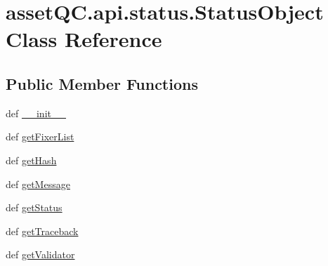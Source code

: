 \hypertarget{classassetQC_1_1api_1_1status_1_1StatusObject}{\section{asset\-Q\-C.\-api.\-status.\-Status\-Object \-Class \-Reference}
\label{d3/d7f/classassetQC_1_1api_1_1status_1_1StatusObject}
}
\subsection*{\-Public \-Member \-Functions}
\begin{DoxyCompactItemize}
\item 
def \hyperlink{classassetQC_1_1api_1_1status_1_1StatusObject_a4cf86eb6ad7484a2fce310e3adceb90a}{\-\_\-\-\_\-init\-\_\-\-\_\-}
\item 
def \hyperlink{classassetQC_1_1api_1_1status_1_1StatusObject_ad8aa307fb35a5ae8f2b706b1da4dd97c}{get\-Fixer\-List}
\item 
def \hyperlink{classassetQC_1_1api_1_1status_1_1StatusObject_aaa5c50ebf8d624e0fc7f16a09e1fea74}{get\-Hash}
\item 
def \hyperlink{classassetQC_1_1api_1_1status_1_1StatusObject_a7bef1acde665d7b5f4ec7e9aa4ce66db}{get\-Message}
\item 
def \hyperlink{classassetQC_1_1api_1_1status_1_1StatusObject_a513e7d4b09a812d72f6965cb0427b6f5}{get\-Status}
\item 
def \hyperlink{classassetQC_1_1api_1_1status_1_1StatusObject_a34ad6bc766907cb91eff1e1017769100}{get\-Traceback}
\item 
def \hyperlink{classassetQC_1_1api_1_1status_1_1StatusObject_af2254cd39841b00452882b945d65556e}{get\-Validator}
\end{DoxyCompactItemize}


